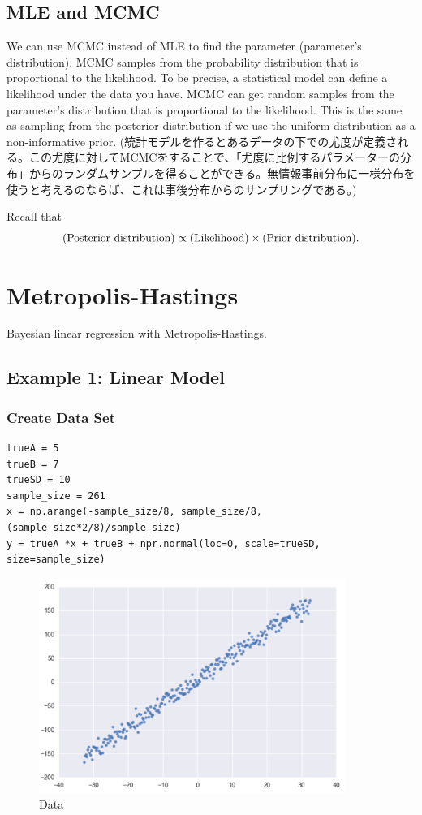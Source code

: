 \documentclass[a4paper,10.5pt,uplatex]{jsarticle}  %
\begin{document}
\subsection{MLE and MCMC}\label{Sec:MLEMCMC}
We can use MCMC instead of MLE to find the parameter (parameter's distribution). MCMC samples from the probability distribution that is proportional to the likelihood. To be precise, a statistical model can define a likelihood under the data you have. MCMC can get random samples from the parameter's distribution that is proportional to the likelihood. This is the same as sampling from the posterior distribution if we use the uniform distribution as a non-informative prior. (統計モデルを作るとあるデータの下での尤度が定義される。この尤度に対してMCMCをすることで、「尤度に比例するパラメーターの分布」からのランダムサンプルを得ることができる。無情報事前分布に一様分布を使うと考えるのならば、これは事後分布からのサンプリングである。)\par
Recall that $$({\rm Posterior\ distribution}) \propto ({\rm Likelihood}) \times ({\rm Prior\ distribution}).$$

\section{Metropolis-Hastings}
Bayesian linear regression with Metropolis-Hastings.

\subsection{Example 1: Linear Model}
\subsubsection{Create Data Set}
\begin{lstlisting}
trueA = 5
trueB = 7
trueSD = 10
sample_size = 261
x = np.arange(-sample_size/8, sample_size/8, (sample_size*2/8)/sample_size)
y = trueA *x + trueB + npr.normal(loc=0, scale=trueSD, size=sample_size)
\end{lstlisting}
\begin{figure}[H]
\centering
\includegraphics[width=10.0cm]{mh-data.pdf}
\caption{Data}
\end{figure}
\end{document}
